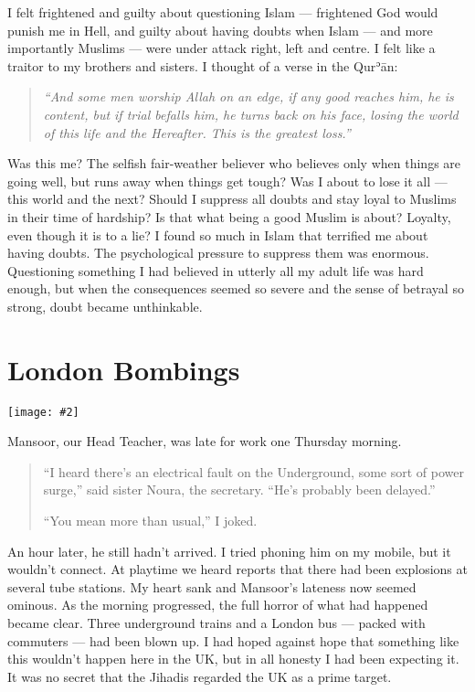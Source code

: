 \documentclass[12pt]{memoir}
\def\´{ʾ} %
\newcommand{\cor}[2]{#2} %
\def \Quran{Qur\-\´ān} %
\newcommand{\img}[3]{\begin{center}%
\texttt{[image: \#2]}\\{\small\em#3}%
\end{center}}
\begin{document}
I felt frightened and guilty about questioning Islam —
frightened God would punish me in Hell,
and guilty about having doubts when Islam —
and more importantly Muslims — were under attack right, left and centre.
I felt like a traitor to my brothers and sisters.
I thought of a verse in the \Quran:

\begin{quote}
\emph{“And some men worship Allah on an edge, if any good reaches him,
he is content, but if trial befalls him, he turns back on his face,
losing the world of this life and the Hereafter.
This is the greatest loss.”}
\end{quote}

Was this me? The selfish fair-weather believer who believes only
when things are going well, but runs away when things get tough?
Was I about to lose it all — this world and the next?
Should I suppress all doubts and stay loyal to Muslims
in their time of hardship?
Is that what being a good Muslim is about?
Loyalty, even though it is to a lie?
I found so much in Islam that terrified me about having doubts.
The psychological pressure to suppress them was enormous.
Questioning something I had believed in utterly
all my adult life was hard enough,
but when the consequences seemed so severe
and the sense of betrayal so strong, doubt became unthinkable.



\chapter{London Bombings}

\img{scale=1.2}{London_Bombings.jpg}{}

Mansoor, our Head Teacher, was late for work one Thursday morning.

\begin{quote}
“I heard there’s an electrical fault on the Underground,
some sort of power surge,” said sister Noura, the secretary.
“He’s probably been delayed.”

“You mean more than usual,” I joked.
\end{quote}

An hour later, he still hadn’t arrived.
I tried phoning him on my mobile, but it wouldn’t connect.
At playtime we heard reports
that there had been explosions at several tube stations.
My heart sank and Mansoor’s lateness now seemed ominous.
As the morning progressed, the full horror of what had happened became clear.
Three underground trains and a London bus —
packed with commuters — had been blown up.
I had hoped against hope that something like this
wouldn’t happen here in the UK, but in all honesty I had been expecting it.
It was no secret that the Jihadis regarded the UK as a prime target.
\end{document}
